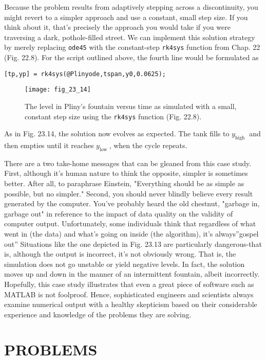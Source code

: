 \documentclass[../main.tex]{subfiles}
\begin{document}
Because the problem results from adaptively stepping across a discontinuity, you
might revert to a simpler approach and use a constant, small step size. If you think about it,
that's precisely the approach you would take if you were traversing a dark, pothole-filled
street. We can implement this solution strategy by merely replacing \texttt{ode45} with the
constant-step \texttt{rk4sys} function from Chap. 22 (Fig. 22.8). For the script outlined above, the
fourth line would be formulated as

\texttt{[tp,yp] = rk4sys(@Plinyode,tspan,y0,0.0625);}

\begin{figure}[H]
    \centering
    \texttt{[image: fig\_23\_14]}
   \caption{\textsf{The level in Pliny's fountain versus time as simulated with a small, constant step size using the
   \texttt{rk4sys} function (Fig. 22.8).}}\label{fig:fig_23_14}
\end{figure}

\noindent As in Fig. 23.14, the solution now evolves as expected. The tank fills to $y_{\text {high }}$ and then empties until it reaches $y_{\text {low }}$, when the cycle repeats.

There are a two take-home messages that can be gleaned from this case study. First, although it's human nature to think the opposite, simpler is sometimes better. After all, to paraphrase Einstein, "Everything should be as simple as possible, but no simpler." Second, you should never blindly believe every result generated by the computer.
You've probably heard the old chestnut, "garbage in, garbage out" in reference to the impact of data quality on the validity of computer output. Unfortunately, some individuals think that regardless of
what went in (the data) and what's going on inside (the algorithm), it's always''gospel out''
Situations like the one depicted in Fig. 23.13 are particularly dangerous-that is, although
the output is incorrect, it's not obviously wrong. That is, the simulation does not go unstable or yield negative levels. In fact, the solution moves up and down in the manner of an
intermittent fountain, albeit incorrectly.
Hopefully, this case study illustrates that even a great piece of software such as
MATLAB is not foolproof. Hence, sophisticated engineers and scientists always examine
numerical output with a healthy skepticism based on their considerable experience and
knowledge of the problems they are solving.
\vspace{5mm}
\section{PROBLEMS}
\end{document}
